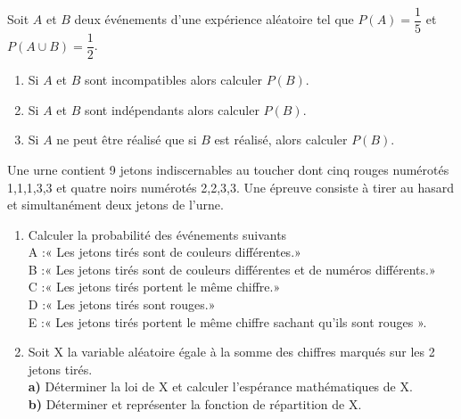 



 \begin{exercice}
Soit $A $ et $B $ deux événements d'une expérience aléatoire tel que $ P(A)=\dfrac{1}{5} $ et $ P(A\cup B)=\dfrac{1}{2} $.
\begin{enumerate}
\item Si $A $ et $B $  sont incompatibles alors calculer $ P(B) $.
\item Si $A $ et $B $  sont indépendants alors calculer $ P(B) $.
\item Si $ A $ ne 
peut être réalisé que si  $B$ est réalisé, alors calculer $ P(B) $.
\end{enumerate}
\end{exercice}
\begin{exercice}
Une urne contient 9 jetons indiscernables au
toucher dont cinq rouges numérotés 1,1,1,3,3 et quatre
noirs numérotés 2,2,3,3.
Une épreuve consiste à tirer au hasard et simultanément deux jetons de l’urne.
\begin{enumerate}
\item Calculer la probabilité des événements suivants\\
A :« Les jetons tirés sont de couleurs différentes.»\\
B :« Les jetons tirés sont de couleurs différentes et
de numéros différents.»\\
C :« Les jetons tirés portent le même chiffre.»\\
D :« Les jetons tirés sont rouges.»\\
E :« Les jetons tirés portent le même chiffre sachant qu’ils sont rouges ».
\item Soit X la variable aléatoire égale à la somme des
chiffres marqués sur les 2 jetons tirés.\\
\textbf{a)} Déterminer la loi de X et  calculer l’espérance mathématiques de X.\\
\textbf{b)} Déterminer et représenter la fonction de répartition de X.

\end{enumerate}
\end{exercice}

